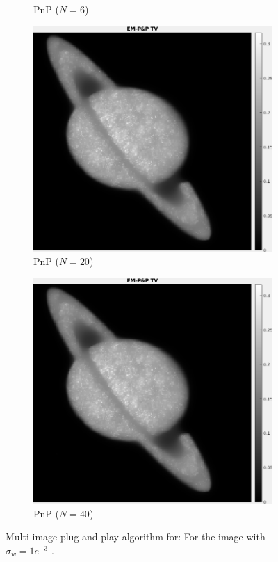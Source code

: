 \documentclass[a4paper, 11pt]{article}
\begin{document}
\begin{figure}[h]
\begin{subfigure}[b]{0.22\textwidth}
        \caption{PnP ($N=6$)}
        \label{fig:PnP-1}
    \end{subfigure}
    \begin{subfigure}[b]{0.22\textwidth}
        \includegraphics[width=\textwidth]{../Figures/PnPReconstructionNoiseSigma1e-3Realization20.png}
        \caption{PnP ($N=20$)}
        \label{fig:PnP0}
    \end{subfigure}
    \begin{subfigure}[b]{0.22\textwidth}
        \includegraphics[width=\textwidth]{../Figures/PnPReconstructionNoiseSigma1e-3Realization20.png}
        \caption{PnP ($N=40$)}
        \label{fig:PnP1}
    \end{subfigure}
\caption{Multi-image plug and play algorithm for: For the image with $\sigma_w=1e^{-3}$  .}
\label{fig:inversionModel}
\end{figure}
\end{document}
